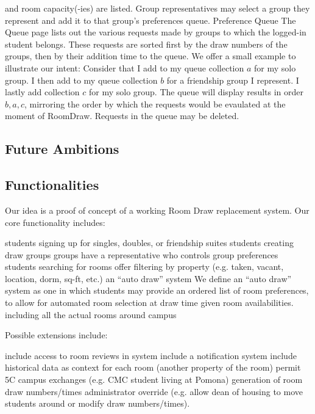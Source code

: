 \begin{outline}
  and room capacity(-ies) are listed. Group representatives may select a group
  they represent and add it to that group's preferences queue.
\1 Preference Queue
  \2 The Queue page lists out the various requests made by groups to which the
  logged-in student belongs. These requests are sorted first by the draw numbers
  of the groups, then by their addition time to the queue. We offer a small
  example to illustrate our intent: Consider that I add to my queue collection
  \(a\) for my solo group. I then add to my queue collection \(b\) for a
  friendship group I represent. I lastly add collection \(c\) for my solo group.
  The queue will display results in order \(b, a, c\), mirroring the order by
  which the requests would be evaulated at the moment of RoomDraw.
  \2 Requests in the queue may be deleted.
\end{outline}

\subsection{Future Ambitions}



\subsection{Functionalities}

Our idea is a proof of concept of a working Room Draw replacement system. Our
core functionality includes:

\begin{outline}
\1 students signing up for singles, doubles, or friendship suites
\1 students creating draw groups
    \2 groups have a representative who controls group preferences
\1 students searching for rooms
    \2 offer filtering by property (e.g. taken, vacant, location, dorm, sq-ft,
    etc.)
\1 an ``auto draw'' system
    \2 We define an ``auto draw'' system as one in which students may provide an
    ordered list of room preferences, to allow for automated room selection at
    draw time given room availabilities.
\1 including all the actual rooms around campus
\end{outline}

Possible extensions include:

\begin{outline}
\1 include access to room reviews in system
\1 include a notification system
\1 include historical data as context for each room (another property of the
    room)
\1 permit 5C campus exchanges (e.g. CMC student living at Pomona)
\1 generation of room draw numbers/times
\1 administrator override (e.g. allow dean of housing to move students around or modify
    draw numbers/times).
\end{outline}